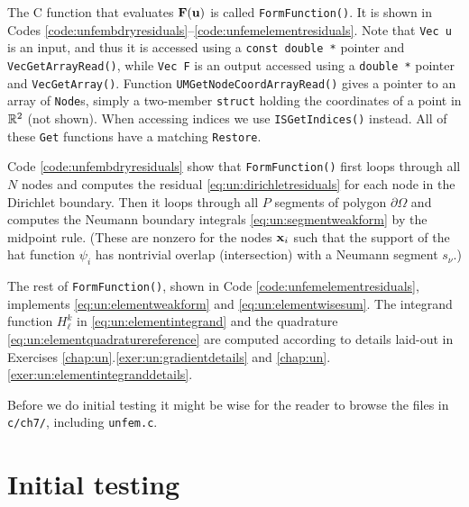 The C function that evaluates $\mathbf{F}(\mathbf{u})$ is called \texttt{FormFunction()}.  It is shown in Codes \ref{code:unfembdryresiduals}--\ref{code:unfemelementresiduals}.  Note that \texttt{Vec u} is an input, and thus it is accessed using a \texttt{const double *} pointer and \texttt{VecGetArrayRead()}, while \texttt{Vec F} is an output accessed using a \texttt{double *} pointer and \texttt{VecGetArray()}.  Function \texttt{UMGetNodeCoordArrayRead()} gives a pointer to an array of \texttt{Node}s, simply a two-member \texttt{struct} holding the coordinates of a point in $\mathbb{R}^2$ (not shown).  When accessing indices we use \texttt{ISGetIndices()} instead.  All of these \texttt{Get} functions have a matching \texttt{Restore}.



Code \ref{code:unfembdryresiduals} show that \texttt{FormFunction()} first loops through all $N$ nodes and computes the residual \eqref{eq:un:dirichletresiduals} for each node in the Dirichlet boundary.  Then it loops through all $P$ segments of polygon $\partial \Omega$ and computes the Neumann boundary integrals \eqref{eq:un:segmentweakform} by the midpoint rule.  (These are nonzero for the nodes $\mathbf{x}_i$ such that the support of the hat function $\psi_i$ has nontrivial overlap (intersection) with a Neumann segment $s_\nu$.)

The rest of \texttt{FormFunction()}, shown in Code \ref{code:unfemelementresiduals}, implements \eqref{eq:un:elementweakform} and \eqref{eq:un:elementwisesum}.  The integrand function $H_\ell^k$ in \eqref{eq:un:elementintegrand} and the quadrature \eqref{eq:un:elementquadraturereference} are computed according to details laid-out in Exercises \ref{chap:un}.\ref{exer:un:gradientdetails} and \ref{chap:un}.\ref{exer:un:elementintegranddetails}.

Before we do initial testing it might be wise for the reader to browse the files in \texttt{c/ch7/}, including \texttt{unfem.c}.


\section{Initial testing}

